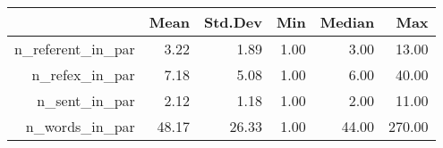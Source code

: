 \begin{table}[ht]
\centering
\begin{tabular}{rrrrrr}
  \hline
 & Mean & Std.Dev & Min & Median & Max \\ 
  \hline
n\_referent\_in\_par & 3.22 & 1.89 & 1.00 & 3.00 & 13.00 \\ 
  n\_refex\_in\_par & 7.18 & 5.08 & 1.00 & 6.00 & 40.00 \\ 
  n\_sent\_in\_par & 2.12 & 1.18 & 1.00 & 2.00 & 11.00 \\ 
  n\_words\_in\_par & 48.17 & 26.33 & 1.00 & 44.00 & 270.00 \\ 
   \hline
\end{tabular}
\end{table}
